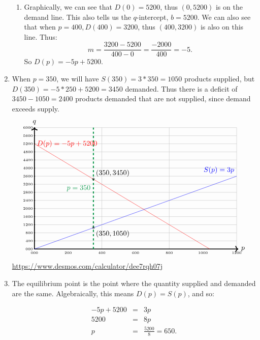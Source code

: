 \begin{example}
\begin{enumerate}
\begin{enumerate}
        \item Graphically, we can see that $D(0)=5200$, thus $(0,5200)$ is on the demand line.  This also tells us the $q$-intercept, $b=5200$.  We can also see that when $p=400, D(400)=3200$, thus $(400,3200)$ is also on this line.  Thus: $$m=\frac{3200-5200}{400-0}=\frac{-2000}{400}=-5.$$  So $D(p)=-5p+5200$.
    \end{enumerate}
    \item When $p=350$, we will have $S(350)=3*350=1050$ products supplied, but $D(350)=-5*250+5200=3450$ demanded.  Thus there is a deficit of $3450-1050=2400$ products demanded that are not supplied, since demand exceeds supply.
    $$\begin{tikzpicture}[yscale=6/60, xscale=10/12]
    \draw[gray!50, thin, step=4] (0,0) grid (12,60);
    \draw[very thick,->] (0,0) -- (12.1,0) node[right] {$p$};
    \draw[very thick,->] (0,0) -- (0,60.1) node[above] {$q$};

    \foreach \x in {0,2,...,12} \draw (\x,0.05) -- (\x,-0.05) node[below] {\tiny\x00};
    \foreach \y in {0,4,...,60} \draw (-0.05,\y) -- (0.05,\y) node[left] {\tiny\y00};



    \draw[scale=1,domain=0:12,smooth,variable=\x,blue] plot ({\x},{3*\x});

    \draw[scale=1,domain=0:10.4,smooth,variable=\x,red] plot ({\x},{-5*\x+52});

    \draw[dashed, ultra thick, ForestGreen] (3.5,0) --node[left]{$p=350$} (3.5,60);

    \draw[red] (0,52) --node[right]{$D(p)=-5p+5200$}(0,52);
    \draw[blue] (12,36) --node[above left]{$S(p)=3p$}(12,36);
    
    \node at (3.5,34.5){$*$};
\draw (3.5,34.5) --node[above right]{$(350,3450)$}(3.5,34.5);

    \node at (3.5,10.5){$*$};
\draw (3.5,10.5) --node[below right]{$(350,1050)$}(3.5,10.5);


\end{tikzpicture}$$
\url{https://www.desmos.com/calculator/dee7rqh07j}

\item The equilibrium point is the point where the quantity supplied and demanded are the same.  Algebraically, this means $D(p)=S(p)$, and so:

\begin{eqnarray*}
-5p+5200&=&3p\\
5200&=&8p\\
p&=&\frac{5200}{8}=650.
\end{eqnarray*}


\end{enumerate}
\end{example}
